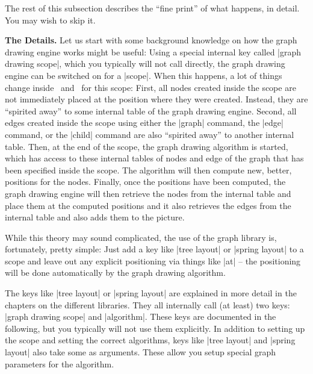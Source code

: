 The rest of this subsection describes the ``fine print'' of what
happens, in detail. You may wish to skip it.

\medskip
\noindent\textbf{The Details.}
Let us start with some background knowledge on how the graph drawing
engine works might be useful: Using a special internal key called
|graph drawing scope|, which you typically will not call directly,
the graph drawing engine can be switched on for a |{scope}|. When this
happens, a lot of things change inside \pgfname\ and \tikzname\ for
this scope: First, all nodes created inside the scope are not
immediately placed at the position where they were created. Instead,
they are ``spirited away'' to some internal table of the graph drawing
engine. Second, all edges created inside the scope using either the
|graph| command, the |edge| command, or the |child| command are also
``spirited away'' to another internal table. Then, at the end of the
scope, the graph drawing algorithm is started, which has access to
these internal tables of nodes and edge of the graph that has been
specified inside the scope. The algorithm will then compute new,
better, positions for the nodes. Finally, once the positions have been
computed, the graph drawing engine will then retrieve the nodes from
the internal table and place them at the computed positions and it
also retrieves the edges from the internal table and also adds them to
the picture.

While this theory may sound complicated, the use of the graph library
is, fortunately, pretty simple: Just add a key like |tree layout| or
|spring layout| to a scope and leave out any explicit positioning via
things like |at| -- the positioning will be done automatically by the
graph drawing algorithm.

The keys like |tree layout| or |spring layout| are explained in more detail
in the chapters on the different libraries. They all internally call
(at least) two keys: |graph drawing scope| and |algorithm|. These
keys are documented in the following, but you typically will not use
them explicitly. In addition to setting up the scope and setting the
correct algorithms, keys like |tree layout| and |spring layout| also take
some  as arguments. These  allow you setup
special graph parameters for the algorithm.

